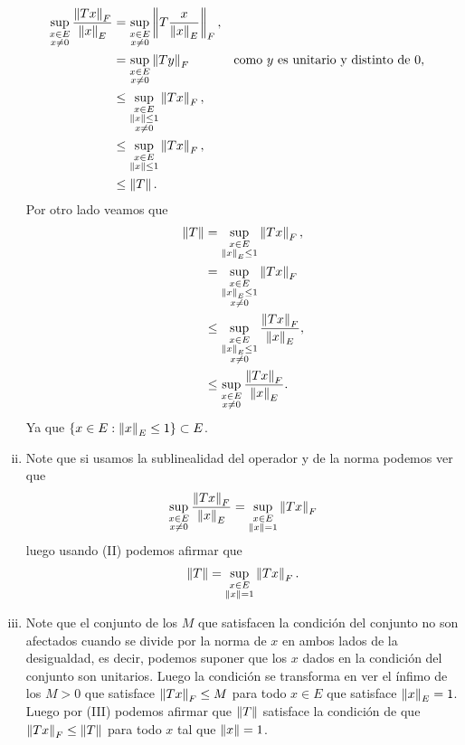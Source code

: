 \begin{homeworkProblem}
\begin{solution}
\begin{enumerate}[(i)]
\begin{align*}
          \sup_{\substack{x\in E\\x\neq 0}}\frac{\left\|Tx\right\|_{F}}{\left\|x\right\|_{E}}&=\sup_{\substack{x\in E\\x\neq 0}}\left\|T\frac{x}{\left\|x\right\|_{E}}\right\|_{F},\\
          &=\sup_{\substack{x\in E\\x\neq 0}}\left\|Ty\right\|_{F} &&\text{como $y$ es unitario y distinto de $0$},\\
          &\leq \sup_{\substack{x\in E\\\left\|x\right\|\leq 1\\ x\neq 0}}\left\|Tx\right\|_{F},\\
          &\leq \sup_{\substack{x\in E\\\left\|x\right\|\leq 1}}\left\|Tx\right\|_{F},\\
          &\leq \left\|T\right\|.
        \end{align*}
        Por otro lado veamos que 
        \begin{align*}
          \left\|T\right\|&= \sup_{\substack{x\in E\\\left\|x\right\|_{E}\leq 1}}\left\|Tx\right\|_{F},\\
          &=\sup_{\substack{x\in E\\\left\|x\right\|_{E}\leq 1\\x\neq 0}}\left\|Tx\right\|_{F}\\
          &\leq \sup_{\substack{x\in E\\ \left\|x\right\|_{E}\leq 1\\x\neq 0}}\frac{\left\|Tx\right\|_{F}}{\left\|x\right\|_{E}},\\
          &\leq \sup_{\substack{x\in E\\x\neq 0}}\frac{\left\|Tx\right\|_{F}}{\left\|x\right\|_{E}}.
        \end{align*}
        Ya que $\{x\in E:\left\|x\right\|_{E}\leq 1\}\subset E$.
      \item Note que si usamos la sublinealidad del operador y de la norma podemos ver que
        \begin{align*}
          \sup_{\substack{x\in E\\x\neq 0}}\frac{\left\|Tx\right\|_{F}}{\left\|x\right\|_{E}}=\sup_{\substack{x\in E\\\left\|x\right\|=1}}\left\|Tx\right\|_{F}
        \end{align*}
        luego usando (II) podemos afirmar que
        \begin{align*}
          \left\|T\right\|=\sup_{\substack{x\in E\\\left\|x\right\|=1}}\left\|Tx\right\|_{F}.
        \end{align*}
      \item Note que el conjunto de los $M$ que satisfacen la condición del conjunto no son afectados cuando se divide por la norma de $x$ en ambos lados de la desigualdad, es decir, podemos suponer que los $x$ dados en la condición del conjunto son unitarios. Luego la condición se transforma en ver el ínfimo de los $M>0$ que satisface $\left\|Tx\right\|_{F}\leq M$ para todo $x\in E$ que satisface $\left\|x\right\|_{E}=1$. Luego por (III) podemos afirmar que $\left\|T\right\|$ satisface la condición de que $\left\|Tx\right\|_{F}\leq \left\|T\right\|$ para todo $x$ tal que $\left\|x\right\|=1$.\\

\end{enumerate}
\end{solution}
\end{homeworkProblem}
